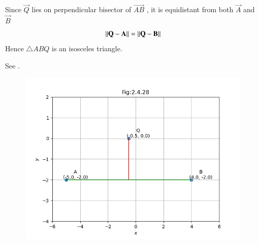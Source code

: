 \documentclass[journal]{IEEEtran}
\numberwithin{equation}{enumi}
\numberwithin{figure}{enumi}
\begin{document}
Since $\vec{Q}$ lies on perpendicular bisector of $\vec{AB}$ , it is equidistant from both $\vec{A}$ and $\vec{B}$
\begin{align}
    \left\lVert\mathbf{Q} - \mathbf{A}\right\rVert = \left\lVert\mathbf{Q} - \mathbf{B}\right\rVert
\end{align}
Hence $\triangle ABQ$ is an isosceles triangle.

See
.

\begin{figure}[H]
    \centering
    \includegraphics[width=1\columnwidth]{figs/perpbisector1.png}
    \caption{}
    \label{fig:2.4.28}
\end{figure}
\end{document}
